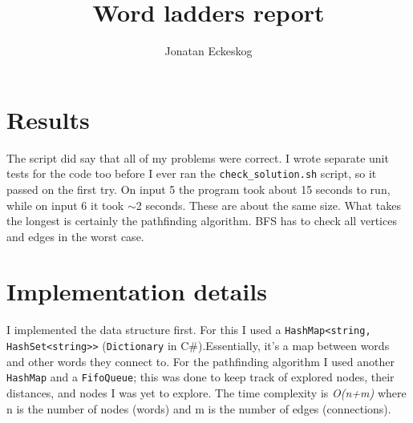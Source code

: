 \documentclass{article}
\title{Word ladders report}
\author{Jonatan Eckeskog}
\begin{document}
  \maketitle

  \section{Results}

  The script did say that all of my problems were correct. I wrote separate unit tests for the code too before I ever ran the \texttt{check\_solution.sh} script, so it passed on the first try.
  On input 5 the program took about 15 seconds to run, while on input 6 it took $\sim$2 seconds. These are about the same size.
  What takes the longest is certainly the pathfinding algorithm. BFS has to check all vertices and edges in the worst case.

  \section{Implementation details}


  I implemented the data structure first. For this I used a \verb|HashMap<string, HashSet<string>>| (\texttt{Dictionary} in C\#).Essentially, it's a map between words and other words they connect to.
  For the pathfinding algorithm I used another \texttt{HashMap} and a \texttt{FifoQueue}; this was done to keep track of explored nodes, their distances, and nodes I was yet to explore.
  The time complexity is \textit{O(n+m)} where n is the number of nodes (words) and m is the number of edges (connections).
\end{document}
